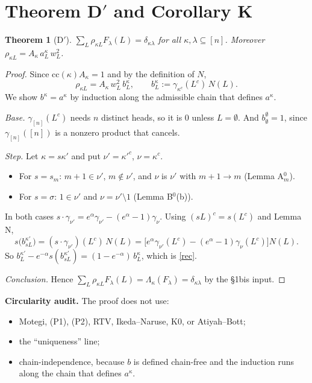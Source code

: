 \documentclass[11pt]{article}
\newcommand{\cc}{\mathrm{cc}}
\newtheorem{theorem}{Theorem}
\theoremstyle{remark}
\begin{document}
\section{Theorem D$'$ and Corollary K}
\begin{theorem}[D$'$]
$\sum_L\rho_{\kappa L}F_\lambda(L)=\delta_{\kappa\lambda}$ for all $\kappa,\lambda\subseteq[n]$. Moreover
$\rho_{\kappa L}=A_\kappa\,a^\kappa_L\,w_L^2$.
\end{theorem}
\begin{proof}
Since $\cc(\kappa)A_\kappa=1$ and by the definition of $N$,
\[
\rho_{\kappa L}=A_\kappa\,w_L^2\,b^\kappa_L,\qquad b^\kappa_L:=\gamma_{\kappa^c}(L^c)\,N(L).
\]
We show $b^\kappa=a^\kappa$ by induction along the admissible chain that defines $a^\kappa$.

\emph{Base.} $\gamma_{[n]}(L^c)$ needs $n$ distinct heads, so it is $0$ unless $L=\emptyset$. And
$b^\emptyset_\emptyset=1$, since $\gamma_{[n]}([n])$ is a nonzero product that cancels.

\emph{Step.} Let $\kappa=s\kappa'$ and put $\nu'=\kappa'^c$, $\nu=\kappa^c$.
\begin{itemize}[leftmargin=*,itemsep=1pt]
\item For $s=s_m$: $m+1\in\nu'$, $m\notin\nu'$, and $\nu$ is $\nu'$ with $m+1\to m$ (Lemma A$^0_m$).
\item For $s=\sigma$: $1\in\nu'$ and $\nu=\nu'\setminus1$ (Lemma B$^0$(b)).
\end{itemize}
In both cases $s\cdot\gamma_{\nu'}=e^\alpha\gamma_{\nu'}-(e^\alpha-1)\gamma_\nu$. Using $(sL)^c=s(L^c)$ and Lemma N,
\[
s\big(b^{\kappa'}_{sL}\big)=(s\cdot\gamma_{\nu'})(L^c)\,N(L)=\big[e^\alpha\gamma_{\nu'}(L^c)-(e^\alpha-1)\gamma_\nu(L^c)\big]N(L).
\]
So $b^{\kappa'}_L-e^{-\alpha}s(b^{\kappa'}_{sL})=(1-e^{-\alpha})\,b^\kappa_L$, which is \eqref{rec}.

\emph{Conclusion.} Hence $\sum_L\rho_{\kappa L}F_\lambda(L)=\Lambda_\kappa(F_\lambda)=\delta_{\kappa\lambda}$ by the \S1bis input.
\end{proof}

\textbf{Circularity audit.} The proof does not use:
\begin{itemize}[leftmargin=*,itemsep=1pt]
\item Motegi, (P1), (P2), RTV, Ikeda--Naruse, K0, or Atiyah--Bott;
\item the ``uniqueness'' line;
\item chain-independence, because $b$ is defined chain-free and the induction runs along the chain that defines $a^\kappa$.
\end{itemize}
\end{document}
